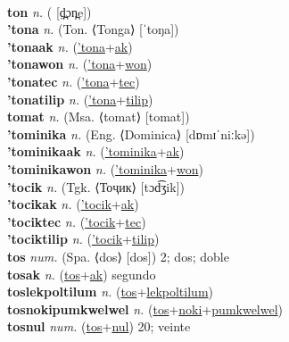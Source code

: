  \label{tolmiki} \\
\textbf{ton} \textit{n.} ( [d̪̤ɔn̪e])
 \label{ton} \\
\textbf{'tona} \textit{n.} (Ton. ⟨Tonga⟩ [ˈtoŋa])
 \label{'tona} \\
\textbf{'tonaak} \textit{n.} (\hyperref['tona]{'tona}+\hyperref[ak]{ak})
 \label{'tonaak} \\
\textbf{'tonawon} \textit{n.} (\hyperref['tona]{'tona}+\hyperref[won]{won})
 \label{'tonawon} \\
\textbf{'tonatec} \textit{n.} (\hyperref['tona]{'tona}+\hyperref[tec]{tec})
 \label{'tonatec} \\
\textbf{'tonatilip} \textit{n.} (\hyperref['tona]{'tona}+\hyperref[tilip]{tilip})
 \label{'tonatilip} \\
\textbf{tomat} \textit{n.} (Msa. ⟨tomat⟩ [tomat])
 \label{tomat} \\
\textbf{'tominika} \textit{n.} (Eng. ⟨Dominica⟩ [dɒmɪˈniːkə])
 \label{'tominika} \\
\textbf{'tominikaak} \textit{n.} (\hyperref['tominika]{'tominika}+\hyperref[ak]{ak})
 \label{'tominikaak} \\
\textbf{'tominikawon} \textit{n.} (\hyperref['tominika]{'tominika}+\hyperref[won]{won})
 \label{'tominikawon} \\
\textbf{'tocik} \textit{n.} (Tgk. ⟨Тоҷик⟩ [tɔd͡ʒik])
 \label{'tocik} \\
\textbf{'tocikak} \textit{n.} (\hyperref['tocik]{'tocik}+\hyperref[ak]{ak})
 \label{'tocikak} \\
\textbf{'tociktec} \textit{n.} (\hyperref['tocik]{'tocik}+\hyperref[tec]{tec})
 \label{'tociktec} \\
\textbf{'tociktilip} \textit{n.} (\hyperref['tocik]{'tocik}+\hyperref[tilip]{tilip})
 \label{'tociktilip} \\
\textbf{tos} \textit{num.} (Spa. ⟨dos⟩ [dos])
2; dos; doble \label{tos} \\
\textbf{tosak} \textit{n.} (\hyperref[tos]{tos}+\hyperref[ak]{ak})
segundo \label{tosak} \\
\textbf{toslekpoltilum} \textit{n.} (\hyperref[tos]{tos}+\hyperref[lekpoltilum]{lekpoltilum})
 \label{toslekpoltilum} \\
\textbf{tosnokipumkwelwel} \textit{n.} (\hyperref[tos]{tos}+\hyperref[noki]{noki}+\hyperref[pumkwelwel]{pumkwelwel})
 \label{tosnokipumkwelwel} \\
\textbf{tosnul} \textit{num.} (\hyperref[tos]{tos}+\hyperref[nul]{nul})
20; veinte \label{tosnul} \\
